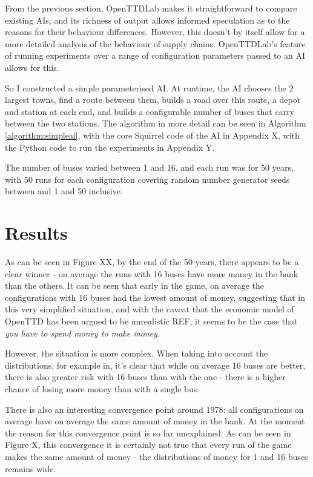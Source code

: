 \documentclass[logo,msc,dsti]{style/infthesis}    %
\begin{document}
{From the previous section, OpenTTDLab makes it straightforward to compare existing AIs, and its richness of output allows informed speculation as to the reasons for their behaviour differences. However, this doesn't by itself allow for a more detailed analysis of the behaviour of supply chains. OpenTTDLab's feature of running experiments over a range of configuration parameters passed to an AI allows for this.

So I constructed a simple parameterised AI. At runtime, the AI chooses the 2 largest towns, find a route between them, builds a road over this route, a depot and station at each end, and builds a configurable number of buses that carry between the two stations. The algorithm in more detail can be seen in Algorithm \ref{algorithm:simpleai}, with the core Squirrel code of the AI in Appendix X, with the Python code to run the experiments in Appendix Y.

The number of buses varied between 1 and 16, and each run was for 50 years, with 50 runs for each configuration covering random number generator seeds between and 1 and 50 inclusive.

\section{Results}

As can be seen in Figure XX, by the end of the 50 years, there appears to be a clear winner - on average the runs with 16 buses have more money in the bank than the others. It can be seen that early in the game, on average the configurations with 16 buses had the lowest amount of money, suggesting that in this very simplified situation, and with the caveat that the economic model of OpenTTD has been argued to be unrealistic REF, it seems to be the case that \emph{you have to spend money to make money}.

However, the situation is more complex. When taking into account the distributions, for example in, it's clear that while on average 16 buses are better, there is also greater risk with 16 buses than with the one - there is a higher chance of losing more money than with a single bus.

There is also an interesting convergence point around 1978: all configurations on average have on average the same amount of money in the bank. At the moment the reason for this convergence point is so far unexplained. As can be seen in Figure X, this convergence it is certainly not true that every run of the game makes the same amount of money - the distributions of money for 1 and 16 buses remains wide.

}
\end{document}
